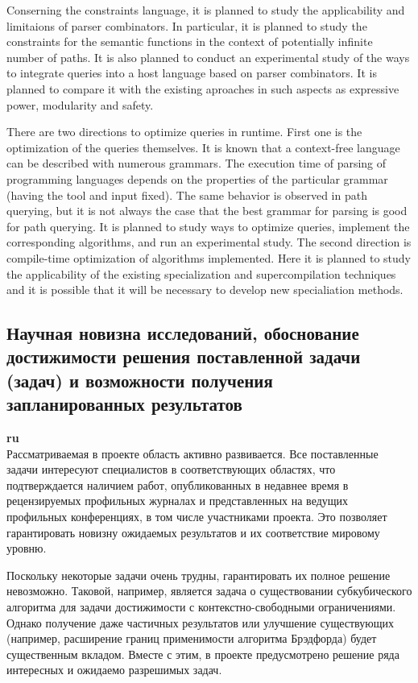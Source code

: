 \documentclass[12pt]{article}  %
\theoremstyle{remark}
\begin{document}
Conserning the constraints language, it is planned to study the applicability and limitaions of parser combinators. In particular, it is planned to study the constraints for the semantic functions in the context of potentially infinite number of paths. It is also planned to conduct an experimental study of the ways to integrate queries into a host language  based on parser combinators. It is planned to compare it with the existing aproaches in such aspects as expressive power, modularity and safety.

There are two directions to optimize queries in runtime. First one is the optimization of the queries themselves. It is known that a context-free language can be described with numerous grammars. The execution time of parsing of programming languages depends on the properties of the particular grammar (having the tool and input fixed). The same behavior is observed in path querying, but it is not always the case that the best grammar for parsing is good for path querying. It is planned to study ways to optimize queries, implement the corresponding algorithms, and run an experimental study. The second direction is compile-time optimization of algorithms implemented. Here it is planned to study the applicability of the existing specialization and supercompilation techniques and it is possible that it will be necessary to develop new specialiation methods.


\subsection{Научная новизна исследований, обоснование достижимости решения поставленной задачи (задач) и возможности получения запланированных результатов}

\textbf{ru}\\
%
Рассматриваемая в проекте область активно развивается. Все поставленные задачи интересуют специалистов в соответствующих областях, что подтверждается наличием работ, опубликованных в недавнее время в рецензируемых профильных журналах и представленных на ведущих профильных конференциях, в том числе участниками проекта. Это позволяет гарантировать новизну ожидаемых результатов и их соответствие мировому уровню.

Поскольку некоторые задачи очень трудны, гарантировать их полное решение невозможно. Таковой, например, является задача о существовании субкубического алгоритма для задачи достижимости с контекстно-свободными ограничениями. Однако получение даже частичных результатов или улучшение существующих (например, расширение границ применимости алгоритма Брэдфорда) будет существенным вкладом. Вместе с этим, в проекте предусмотрено решение ряда интересных и ожидаемо разрешимых задач.
\end{document}
